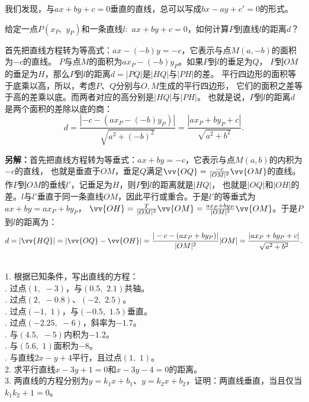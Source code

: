 \documentclass[12pt,UTF8,fontset=none]{ctexbook}
\begin{document}
我们发现，与$ax + by + c = 0$垂直的直线，总可以写成$bx - ay + c' = 0$的形式。

\begin{et}
    给定一点$P(x_P, \,\,y_P)$和一条直线$l: \,\, ax + by + c = 0$，如何计算$P$到直线$l$的距离$d$？
\end{et}
\begin{so}
    首先把直线方程转为等高式：$ax - (-b)y = -c$，它表示与点$M(a, -b)$的面积为$-c$的直线。
$P$与点$M$的面积为$ax_P - (-b)y_P$。如果$P$到$l$的垂足为$Q$，
$P$到$OM$的垂足为$H$，那么$P$到$l$的距离$d = |PQ|$是$|HQ|$与$|PH|$的差。
平行四边形的面积等于底乘以高，所以，考虑$P$、$Q$分别与$O, M$生成的平行四边形，
它们的面积之差等于高的差乘以底。而两者对应的高分别是$|HQ|$与$|PH|$。
也就是说，$P$到$l$的距离$d$是两个面积的差除以底的商：
$$ d = \frac{|-c - (ax_P - (-b)y_P)|}{\sqrt{a^2 + (-b)^2}} = \frac{|ax_P + by_P + c|}{\sqrt{a^2 + b^2}}.$$

\textbf{另解：}首先把直线方程转为等垂式：$ax + by = -c$，它表示与点$M(a, b)$的内积为$-c$的直线，
也就是垂直于$OM$，垂足$Q$满足$\vv{OQ} = \frac{-c}{|OM|^2}\vv{OM}$的直线。作$P$到$OM$的垂线$l'$，记垂足为$H$，则$P$到$l$的距离就是$|HQ|$，
也就是$|OQ|$和$|OH|$的差。$l$与$l'$垂直于同一条直线$OM$，因此平行或重合。于是$l'$的等垂式为$ax + by = ax_P + by_P$，
$\vv{OH} = \frac{T}{|OM|^2}\vv{OM} = \frac{ax_P + by_P}{|OM|^2}\vv{OM}$。于是$P$到$l$的距离为：
$$ d = |\vv{HQ}| = |\vv{OQ} - \vv{OH}| = \frac{|-c - (ax_P + by_P)|}{|OM|^2} |OM| = \frac{|ax_P + by_P + c|}{\sqrt{a^2 + b^2}}. $$
\end{so}

\begin{xt}
    \mbox{}\\
    1. 根据已知条件，写出直线的方程：\\
    . 过点$(1, \,\,-3)$，与$(0.5, \,\,2.1)$共轴。\\
    . 过点$(2, \,\,-0.8)$、$(-2, \,\,2.5)$。\\
    . 过点$(-1, \,\,1)$，与$(-0.5, \,\,1.5)$垂直。\\
    . 过点$(-2.25, \,\,-6)$，斜率为$-1.7$。\\
    . 与$(4.5,\,\, -5)$内积为$-1.2$。\\
    . 与$(5.6, \,\,1)$面积为$-8$。\\
    . 与直线$2x - y + 4$平行，且过点$(1, \,\, 1)$。 \\
    2. 求平行直线$x - 3y + 1 = 0$和$x - 3y - 4 = 0$的距离。 \\
    3. 两直线的方程分别为$y = k_1 x + b_1$、$y = k_2 x + b_2$，证明：两直线垂直，当且仅当$k_1k_2 + 1 = 0$。
\end{xt}
\end{document}
